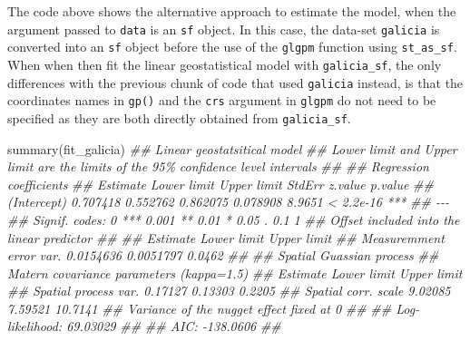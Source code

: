 \documentclass[
  letterpaper,
]{krantz}
\newenvironment{Shaded}{\begin{snugshade}}{\end{snugshade}}
\newcommand{\DocumentationTok}[1]{\textcolor[rgb]{0.37,0.37,0.37}{\textit{#1}}}
\newcommand{\FunctionTok}[1]{\textcolor[rgb]{0.28,0.35,0.67}{#1}}
\newcommand{\NormalTok}[1]{\textcolor[rgb]{0.00,0.23,0.31}{#1}}
\begin{document}
The code above shows the alternative approach to estimate the model,
when the argument passed to \texttt{data} is an \texttt{sf} object. In
this case, the data-set \texttt{galicia} is converted into an
\texttt{sf} object before the use of the \texttt{glgpm} function using
\texttt{st\_as\_sf}. When when then fit the linear geostatistical model
with \texttt{galicia\_sf}, the only differences with the previous chunk
of code that used \texttt{galicia} instead, is that the coordinates
names in \texttt{gp()} and the \texttt{crs} argument in \texttt{glgpm}
do not need to be specified as they are both directly obtained from
\texttt{galicia\_sf}.

\begin{Shaded}
\begin{Highlighting}[]
\FunctionTok{summary}\NormalTok{(fit\_galicia)}
\DocumentationTok{\#\# Linear geostatsitical model }
\DocumentationTok{\#\# \textquotesingle{}Lower limit\textquotesingle{} and \textquotesingle{}Upper limit\textquotesingle{} are the limits of the 95\% confidence level intervals }
\DocumentationTok{\#\# }
\DocumentationTok{\#\#  Regression coefficients }
\DocumentationTok{\#\#             Estimate Lower limit Upper limit   StdErr z.value   p.value    }
\DocumentationTok{\#\# (Intercept) 0.707418    0.552762    0.862075 0.078908  8.9651 \textless{} 2.2e{-}16 ***}
\DocumentationTok{\#\# {-}{-}{-}}
\DocumentationTok{\#\# Signif. codes:  0 \textquotesingle{}***\textquotesingle{} 0.001 \textquotesingle{}**\textquotesingle{} 0.01 \textquotesingle{}*\textquotesingle{} 0.05 \textquotesingle{}.\textquotesingle{} 0.1 \textquotesingle{} \textquotesingle{} 1}
\DocumentationTok{\#\# Offset included into the linear predictor }
\DocumentationTok{\#\# }
\DocumentationTok{\#\#                           Estimate Lower limit Upper limit}
\DocumentationTok{\#\# Measuremment error var. 0.0154636   0.0051797      0.0462}
\DocumentationTok{\#\# }
\DocumentationTok{\#\#  Spatial Guassian process }
\DocumentationTok{\#\# Matern covariance parameters (kappa=1.5) }
\DocumentationTok{\#\#                      Estimate Lower limit Upper limit}
\DocumentationTok{\#\# Spatial process var.  0.17127     0.13303      0.2205}
\DocumentationTok{\#\# Spatial corr. scale   9.02085     7.59521     10.7141}
\DocumentationTok{\#\# Variance of the nugget effect fixed at 0 }
\DocumentationTok{\#\# }
\DocumentationTok{\#\#  Log{-}likelihood: 69.03029}
\DocumentationTok{\#\# }
\DocumentationTok{\#\#  AIC: {-}138.0606}
\DocumentationTok{\#\# }
\end{Highlighting}
\end{Shaded}
\end{document}
